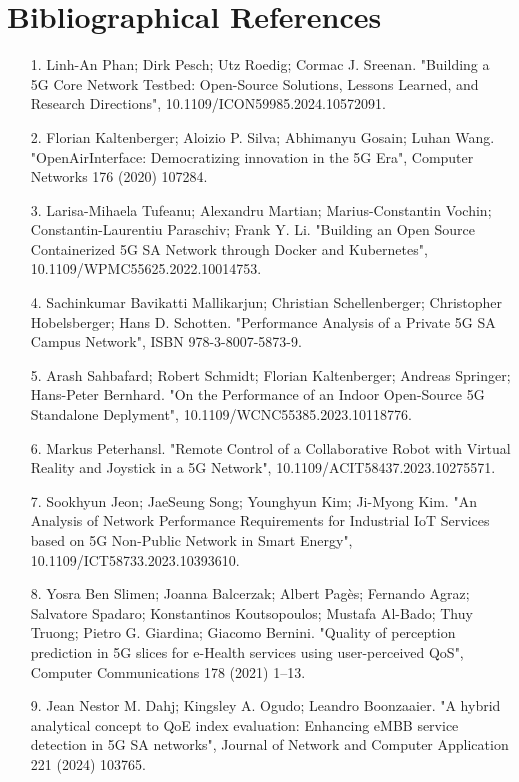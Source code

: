 \documentclass{report}
\begin{document}
\chapter{Bibliographical References}
\begin{itemize}
	\item[1.] Linh-An Phan; Dirk Pesch; Utz Roedig; Cormac J. Sreenan. "Building a 5G Core Network Testbed: Open-Source Solutions, Lessons Learned, and Research Directions", 10.1109/ICON59985.2024.10572091.
\item[2.] Florian Kaltenberger; Aloizio P. Silva; Abhimanyu Gosain; Luhan Wang. "OpenAirInterface: Democratizing innovation in the 5G Era", Computer Networks 176 (2020) 107284.
\item[3.] Larisa-Mihaela Tufeanu; Alexandru Martian; Marius-Constantin Vochin; Constantin-Laurentiu Paraschiv; Frank Y. Li. "Building an Open Source Containerized 5G SA Network through Docker and Kubernetes", 10.1109/WPMC55625.2022.10014753.
\item[4.] Sachinkumar Bavikatti Mallikarjun; Christian Schellenberger; Christopher Hobelsberger; Hans D. Schotten. "Performance Analysis of a Private 5G SA Campus Network", ISBN 978-3-8007-5873-9.
\item[5.] Arash Sahbafard; Robert Schmidt; Florian Kaltenberger; Andreas Springer; Hans-Peter Bernhard. "On the Performance of an Indoor Open-Source 5G Standalone Deplyment", 10.1109/WCNC55385.2023.10118776.
\item[6.] Markus Peterhansl. "Remote Control of a Collaborative Robot with Virtual Reality and Joystick in a 5G Network", 10.1109/ACIT58437.2023.10275571.
\item[7.] Sookhyun Jeon; JaeSeung Song; Younghyun Kim; Ji-Myong Kim. "An Analysis of Network Performance Requirements for Industrial IoT Services based on 5G Non-Public Network in Smart Energy",\\ 10.1109/ICT58733.2023.10393610.
\item[8.] Yosra Ben Slimen; Joanna Balcerzak; Albert Pagès; Fernando Agraz; Salvatore Spadaro;
Konstantinos Koutsopoulos; Mustafa Al-Bado; Thuy Truong; Pietro G. Giardina; Giacomo Bernini. "Quality of perception prediction in 5G slices for e-Health services using user-perceived QoS", Computer Communications 178 (2021) 1–13.
\item[9.] Jean Nestor M. Dahj; Kingsley A. Ogudo; Leandro Boonzaaier. "A hybrid analytical concept to QoE index evaluation: Enhancing eMBB service detection in 5G SA networks", Journal of Network and Computer Application 221 (2024) 103765.

\end{itemize}
\end{document}
